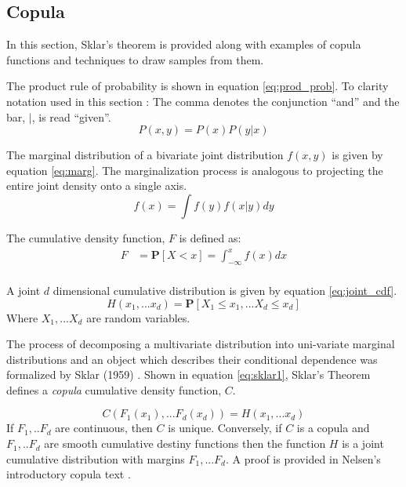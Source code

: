 
\subsection{Copula}

In this section, Sklar's theorem is provided along with examples of copula functions
and techniques to draw samples from them. 

The product rule of probability is shown in equation \ref{eq:prod_prob}.  To clarity notation used in this section : The comma denotes the conjunction ``and'' and the bar, $|$, is read ``given''.
\begin{equation}
P(x, y) = P(x) P(y | x)
\label{eq:prod_prob}
\end{equation}

The marginal distribution of a bivariate joint distribution $f(x, y)$ is given by equation \ref{eq:marg}.  The marginalization process is analogous to projecting the entire joint density onto a single axis.
\begin{equation}
f(x) = \int f(y) f(x|y) dy
\label{eq:marg}
\end{equation}

The cumulative density function, $F$ is defined as:
\begin{align*} 
F &= \mathbf{P}[X < x] = \int_{-\infty}^x f(x)dx \\
\end{align*}

A joint $d$ dimensional cumulative distribution is given by equation \ref{eq:joint_cdf}.
\begin{equation}
H(x_1, ... x_d) = \mathbf P[X_1 \leq x_1, ... X_d \leq x_d]
\label{eq:joint_cdf}
\end{equation}
Where $X_1, ... X_d$ are random variables.

The process of decomposing a multivariate distribution into uni-variate marginal
distributions and an object which describes their conditional dependence was
formalized by Sklar (1959) \cite{Sklar1959}.  Shown in equation \ref{eq:sklar1},  Sklar's Theorem
defines a \emph{copula} cumulative density function, $C$.

\begin{equation}
C(F_1(x_1), ... F_d(x_d)) = H(x_1, ... x_d)
\label{eq:sklar1}
\end{equation}
If $F_1, .. F_d$ are continuous, then $C$ is unique.  Conversely, if $C$ is a copula and $F_1, .. F_d$ are smooth cumulative destiny functions then the function $H$ is a joint cumulative distribution with margins $F_1, ... F_d$.  A proof is provided in Nelsen's introductory copula text \cite{Nelsen2006}.

